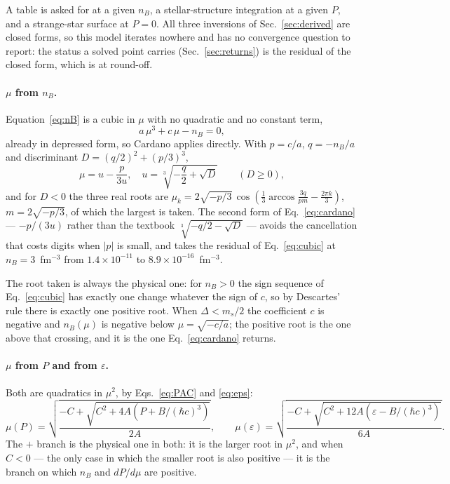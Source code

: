 \documentclass[aps,prc,onecolumn,superscriptaddress,nofootinbib,10pt]{revtex4-2}
\newcommand{\nB}{n_B}
\newcommand{\hc}{(\hbar c)^3}
\newcommand{\ms}{m_s}
\begin{document}
A table is asked for at a given $\nB$, a stellar-structure integration at a
given $P$, and a strange-star surface at $P = 0$. All three inversions of
Sec.~\ref{sec:derived} are closed forms, so this model iterates nowhere and
has no convergence question to report: the status a solved point carries
(Sec.~\ref{sec:returns}) is the residual of the closed form, which is at
round-off.

\paragraph{$\mu$ from $\nB$.} Equation~\eqref{eq:nB} is a cubic in $\mu$ with
no quadratic and no constant term,
%
\begin{equation}
a\,\mu^3 + c\,\mu - \nB = 0 ,
\label{eq:cubic}
\end{equation}
%
already in depressed form, so Cardano applies directly. With
$p = c/a$, $q = -\nB/a$ and discriminant $D = (q/2)^2 + (p/3)^3$,
%
\begin{equation}
\mu = u - \frac{p}{3u} , \quad u = \sqrt[3]{-\frac{q}{2} + \sqrt{D}}
\qquad (D \ge 0) ,
\label{eq:cardano}
\end{equation}
%
and for $D < 0$ the three real roots are
$\mu_k = 2\sqrt{-p/3}\,\cos\!\left(\frac{1}{3}\arccos\frac{3q}{pm}
- \frac{2\pi k}{3}\right)$, $m = 2\sqrt{-p/3}$, of which the largest is taken.
The second form of Eq.~\eqref{eq:cardano} --- $-p/(3u)$ rather than the
textbook $\sqrt[3]{-q/2 - \sqrt{D}}$ --- avoids the cancellation that costs
digits when $|p|$ is small, and takes the residual of
Eq.~\eqref{eq:cubic} at $\nB = 3$~fm$^{-3}$ from $1.4\times10^{-11}$ to
$8.9\times10^{-16}$~fm$^{-3}$.

The root taken is always the physical one: for $\nB > 0$ the sign sequence of
Eq.~\eqref{eq:cubic} has exactly one change whatever the sign of $c$, so by
Descartes' rule there is exactly one positive root. When $\Delta < \ms/2$ the
coefficient $c$ is negative and $\nB(\mu)$ is negative below
$\mu = \sqrt{-c/a}$; the positive root is the one above that crossing, and it
is the one Eq.~\eqref{eq:cardano} returns.

\paragraph{$\mu$ from $P$ and from $\varepsilon$.} Both are quadratics in
$\mu^2$, by Eqs.~\eqref{eq:PAC} and \eqref{eq:eps}:
%
\begin{equation}
\mu(P) = \sqrt{\frac{-C + \sqrt{C^2 + 4A\left(P + B/\hc\right)}}{2A}} ,
\qquad
\mu(\varepsilon) = \sqrt{\frac{-C + \sqrt{C^2 + 12A\left(\varepsilon -
B/\hc\right)}}{6A}} .
\label{eq:quadratics}
\end{equation}
%
The $+$ branch is the physical one in both: it is the larger root in $\mu^2$,
and when $C < 0$ --- the only case in which the smaller root is also positive
--- it is the branch on which $\nB$ and $dP/d\mu$ are positive.
\end{document}
